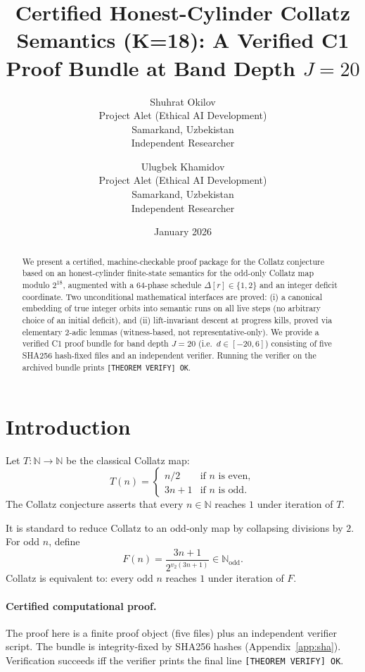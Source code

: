\documentclass[11pt]{article}
\title{Certified Honest-Cylinder Collatz Semantics (K=18): A Verified C1 Proof Bundle at Band Depth $J=20$}
\author{
Shuhrat Okilov\\
\small Project Alet (Ethical AI Development)\\
\small Samarkand, Uzbekistan\\
\small Independent Researcher
\and
Ulugbek Khamidov\\
\small Project Alet (Ethical AI Development)\\
\small Samarkand, Uzbekistan\\
\small Independent Researcher
}
\date{January 2026}
\begin{document}
\maketitle

\begin{abstract}
We present a certified, machine-checkable proof package for the Collatz conjecture based on an honest-cylinder
finite-state semantics for the odd-only Collatz map modulo $2^{18}$, augmented with a 64-phase schedule
$\Delta[r]\in\{1,2\}$ and an integer deficit coordinate.
Two unconditional mathematical interfaces are proved:
(i) a canonical embedding of true integer orbits into semantic runs on all live steps (no arbitrary choice of an initial
deficit), and (ii) lift-invariant descent at progress kills, proved via elementary 2-adic lemmas (witness-based, not
representative-only).
We provide a verified C1 proof bundle for band depth $J=20$ (i.e.\ $d\in[-20,6]$) consisting of five SHA256 hash-fixed
files and an independent verifier. Running the verifier on the archived bundle prints \texttt{[THEOREM VERIFY] OK}.
\end{abstract}

\section{Introduction}

Let $T:\mathbb{N}\to\mathbb{N}$ be the classical Collatz map:
\[
T(n)=\begin{cases}
n/2 & \text{if $n$ is even},\\
3n+1 & \text{if $n$ is odd}.
\end{cases}
\]
The Collatz conjecture asserts that every $n\in\mathbb{N}$ reaches $1$ under iteration of $T$.

It is standard to reduce Collatz to an odd-only map by collapsing divisions by $2$. For odd $n$, define
\[
F(n)=\frac{3n+1}{2^{v_2(3n+1)}}\in\mathbb{N}_{\mathrm{odd}}.
\]
Collatz is equivalent to: every odd $n$ reaches $1$ under iteration of $F$.

\paragraph{Certified computational proof.}
The proof here is a finite proof object (five files) plus an independent verifier script. The bundle is integrity-fixed by
SHA256 hashes (Appendix~\ref{app:sha}). Verification succeeds iff the verifier prints the final line
\texttt{[THEOREM VERIFY] OK}.
\end{document}
